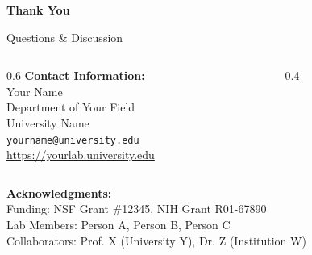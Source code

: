 \documentclass[aspectratio=169,11pt]{beamer}
\begin{document}
\begin{frame}[plain]
  \begin{center}
    {\LARGE \textbf{Thank You}}

    \vspace{1cm}

    {\Large Questions \& Discussion}

    \vspace{1.5cm}

    \begin{columns}
      \begin{column}{0.6\textwidth}
        \textbf{Contact Information:}\\
        Your Name\\
        Department of Your Field\\
        University Name\\
        \texttt{yourname@university.edu}\\
        \url{https://yourlab.university.edu}
      \end{column}

      \begin{column}{0.4\textwidth}
      \end{column}
    \end{columns}

    \vspace{1cm}

    {\footnotesize
      \textbf{Acknowledgments:}\\
      Funding: NSF Grant \#12345, NIH Grant R01-67890\\
      Lab Members: Person A, Person B, Person C\\
      Collaborators: Prof. X (University Y), Dr. Z (Institution W)
    }
  \end{center}
\end{frame}


\appendix
\end{document}
